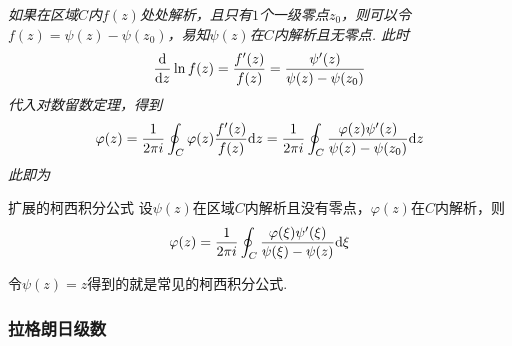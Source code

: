 \documentclass[main.tex]{subfiles}
\begin{document}
\vspace{1cm}

\textit{
如果在区域\(C\)内\(f(z)\)处处解析，且只有\(1\)个一级零点\(z_0\)，则可以令\(f(z)=\psi(z)-\psi(z_0)\)，易知\(\psi(z)\)在\(C\)内解析且无零点. 此时
\[\frac{{\rm d}}{{\rm d}z}\ln f(z) = \frac{f'(z)}{f(z)}=\frac{\psi'(z)}{\psi(z)-\psi(z_0)}\]
代入对数留数定理，得到
\[\varphi(z) = \frac{1}{2\pi i}\oint_C \varphi(z)\frac{f'(z)}{f(z)}{\rm d}z = \frac{1}{2\pi i}\oint_C\frac{\varphi(z)\psi'(z)}{\psi(z)-\psi(z_0)}{\rm d}z\]
此即为
}
\begin{theorem}{扩展的柯西积分公式}
    设\(\psi(z)\)在区域\(C\)内解析且没有零点，\(\varphi(z)\)在\(C\)内解析，则
    \[\varphi(z)=\frac{1}{2 \pi i}\oint_C\frac{\varphi(\xi)\psi'(\xi)}{\psi(\xi)-\psi(z)}{\rm d}\xi\]
\end{theorem}
令\(\psi(z)=z\)得到的就是常见的柯西积分公式.

\subsubsection{拉格朗日级数}
\end{document}
